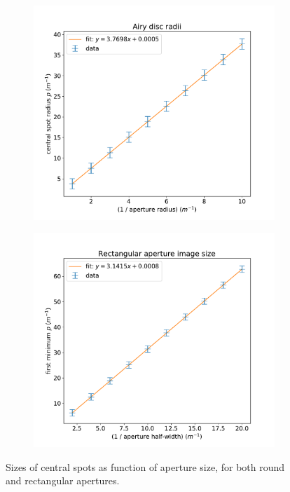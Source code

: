 \documentclass[11pt]{article}
\begin{document}
\begin{figure}
    \centering
    \begin{subfigure}{0.5\textwidth}
        \centering
        \includegraphics[width=\textwidth]{pictures/tests/airy.pdf}
        \caption{}\label{fig:test1:round}
    \end{subfigure}%
    \begin{subfigure}{0.5\textwidth}
        \centering
        \includegraphics[width=\textwidth]{pictures/tests/rect.pdf}
        \caption{}\label{fig:test1:rect}
    \end{subfigure}
    \caption{Sizes of central spots as function of aperture size, for both round and rectangular apertures.}\label{fig:test1}
\end{figure}
\end{document}
